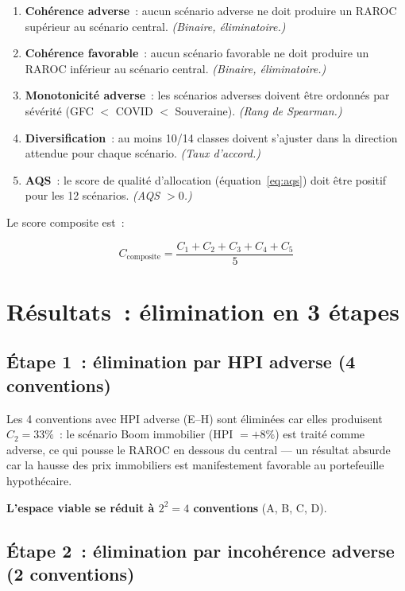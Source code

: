 \documentclass[12pt, a4paper, twoside, openright]{report}
\theoremstyle{definition}
\begin{document}
\begin{enumerate}
\item[$C_1$] \textbf{Cohérence adverse}~: aucun scénario adverse ne doit produire un RAROC supérieur au scénario central. \emph{(Binaire, éliminatoire.)}
\item[$C_2$] \textbf{Cohérence favorable}~: aucun scénario favorable ne doit produire un RAROC inférieur au scénario central. \emph{(Binaire, éliminatoire.)}
\item[$C_3$] \textbf{Monotonicité adverse}~: les scénarios adverses doivent être ordonnés par sévérité (GFC $<$ COVID $<$ Souveraine). \emph{(Rang de Spearman.)}
\item[$C_4$] \textbf{Diversification}~: au moins 10/14 classes doivent s'ajuster dans la direction attendue pour chaque scénario. \emph{(Taux d'accord.)}
\item[$C_5$] \textbf{AQS}~: le score de qualité d'allocation (équation~\ref{eq:aqs}) doit être positif pour les 12 scénarios. \emph{(AQS $> 0$.)}
\end{enumerate}

Le score composite est~:

\begin{equation}
C_{\text{composite}} = \frac{C_1 + C_2 + C_3 + C_4 + C_5}{5}
\label{eq:composite}
\end{equation}


\section{Résultats~: élimination en 3 étapes}
\label{sec:conv-resultats}

\subsection{Étape 1~: élimination par HPI adverse (4 conventions)}

Les 4 conventions avec HPI adverse (E--H) sont éliminées car elles produisent $C_2 = 33\%$~: le scénario Boom immobilier (HPI $= +8\%$) est traité comme adverse, ce qui pousse le RAROC en dessous du central --- un résultat absurde car la hausse des prix immobiliers est manifestement favorable au portefeuille hypothécaire.

\textbf{L'espace viable se réduit à $2^2 = 4$ conventions} (A, B, C, D).

\subsection{Étape 2~: élimination par incohérence adverse (2 conventions)}
\end{document}
